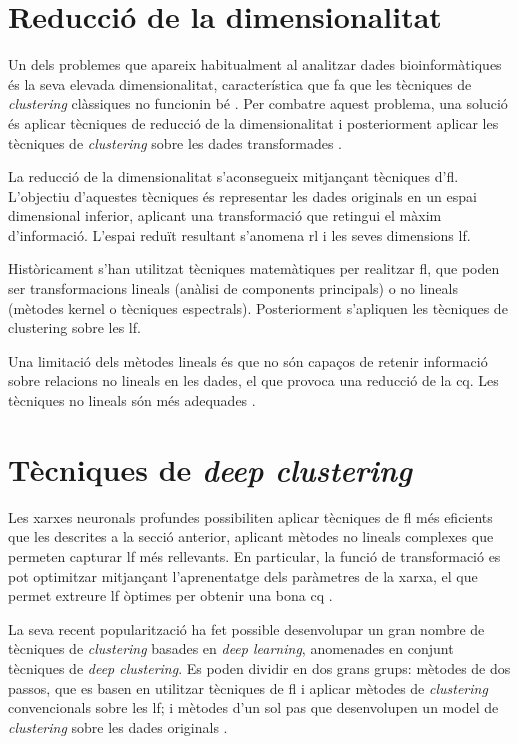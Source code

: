 \documentclass[CAT,BIB]{TFUOC}%
\begin{document}
    \section{Reducció de la dimensionalitat}
    \label{s:state_reduccio}

        Un dels problemes que apareix habitualment al analitzar dades bioinformàtiques és la seva elevada dimensionalitat, característica que fa que les tècniques de \textit{clustering} clàssiques no funcionin bé \citep{Masood2015, Karim2021}. Per combatre aquest problema, una solució és aplicar tècniques de reducció de la dimensionalitat i posteriorment aplicar les tècniques de \textit{clustering} sobre les dades transformades \citep{Min2018, Masood2015}.

        La reducció de la dimensionalitat s'aconsegueix mitjançant tècniques d'\gls{fl}. L'objectiu d'aquestes tècniques és representar les dades originals en un espai dimensional inferior, aplicant una transformació que retingui el màxim d'informació. L'espai reduït resultant s'anomena \gls{rl} i les seves dimensions \gls{lf}.

        Històricament s'han utilitzat tècniques matemàtiques per realitzar \gls{fl}, que poden ser transformacions lineals (anàlisi de components principals) o no lineals (mètodes kernel o tècniques espectrals). Posteriorment s'apliquen les tècniques de clustering sobre les \gls{lf}.

        Una limitació dels mètodes lineals és que no són capaços de retenir informació sobre relacions no lineals en les dades, el que provoca una reducció de la \gls{cq}. Les tècniques no lineals són més adequades \citep{Karim2021}.

    \section{Tècniques de \textit{deep clustering}}
    \label{s:state_deep}

        Les xarxes neuronals profundes possibiliten aplicar tècniques de \gls{fl} més eficients que les descrites a la secció anterior, aplicant mètodes no lineals complexes que permeten capturar \gls{lf} més rellevants. En particular, la funció de transformació es pot optimitzar mitjançant l'aprenentatge dels paràmetres de la xarxa, el que permet extreure \gls{lf} òptimes per obtenir una bona \gls{cq} \citep{Karim2021}.

        La seva recent popularització ha fet possible desenvolupar un gran nombre de tècniques de \textit{clustering} basades en \textit{deep learning}, anomenades en conjunt tècniques de \textit{deep clustering}. Es poden dividir en dos grans grups: mètodes de dos passos, que es basen en utilitzar tècniques de \gls{fl} i aplicar mètodes de \textit{clustering} convencionals sobre les \gls{lf}; i mètodes d'un sol pas que desenvolupen un model de \textit{clustering} sobre les dades originals \citep{Karim2021}.
\end{document}
